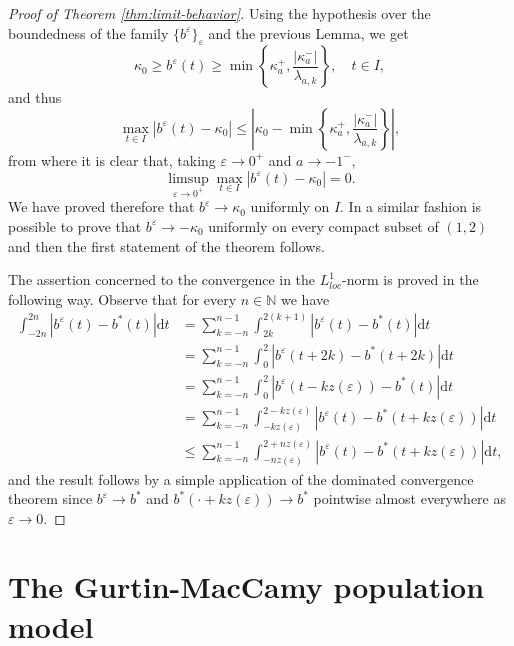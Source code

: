 \documentclass[a4paper,11pt]{article}
\theoremstyle{plain}
\theoremstyle{definition}
\theoremstyle{definition}
\newcommand{\N}{\mathbb{N}}
\newcommand{\dd}{\mathrm{d}}
\numberwithin{equation}{section}
\begin{document}
\begin{proof}[Proof of Theorem \ref{thm:limit-behavior}]
Using the hypothesis over the boundedness of the family $\{ b^\varepsilon \}_\varepsilon$ and the previous Lemma, we get
\[
     \kappa_0 \geq b^\varepsilon(t) \geq \min\left\{ \kappa_a^+, \frac{|\kappa_a^-|}{\lambda_{a,k}} \right\}, \quad t\in I,
\]
and thus
\[
    \max_{t\in I} |b^\varepsilon(t) - \kappa_0| \leq \left| \kappa_0 - \min\left\{ \kappa_a^+, \frac{|\kappa_a^-|}{\lambda_{a,k}} \right\} \right|,
\]
from where it is clear that, taking $\varepsilon\to 0^+$ and $a\to -1^{-}$,
\[
    \limsup_{\varepsilon\to 0^+} \max_{t\in I} |b^\varepsilon(t) - \kappa_0| = 0.
\]
We have proved therefore that $b^\varepsilon\to \kappa_0$ uniformly on $I$. In a similar fashion is possible to prove that $b^\varepsilon \to -\kappa_0$ uniformly on every compact subset of $(1,2)$ and then the first statement of the theorem follows.

The assertion concerned to the convergence in the $L^1_{loc}$-norm is proved in the following way. Observe that for every $n\in \N$ we have
\begin{align*}
    \int_{-2n}^{2n} |b^\varepsilon(t) - b^*(t)| \dd t &= \sum_{k=-n}^{n-1} \int_{2k}^{2(k+1)} |b^\varepsilon(t) - b^*(t)| \dd t \\
    &= \sum_{k=-n}^{n-1} \int_0^2 |b^\varepsilon(t+2k) - b^*(t+2k)| \dd t \\
    &= \sum_{k=-n}^{n-1} \int_0^2 |b^\varepsilon(t - kz(\varepsilon)) - b^*(t)| \dd t \\
    &= \sum_{k=-n}^{n-1} \int_{-kz(\varepsilon)}^{2-kz(\varepsilon)} |b^\varepsilon(t) - b^*(t + kz(\varepsilon))| \dd t \\
    &\leq \sum_{k=-n}^{n-1} \int_{-nz(\varepsilon)}^{2+nz(\varepsilon)} |b^\varepsilon(t) - b^*(t+kz(\varepsilon))| \dd t,
\end{align*}
and the result follows by a simple application of the dominated convergence theorem since $b^\varepsilon\to b^*$ and $b^*(\cdot + kz(\varepsilon))\to b^*$ pointwise almost everywhere as $\varepsilon\to 0$.
\end{proof}

\section{The Gurtin-MacCamy population model}\label{sec:gurtin}
\end{document}
